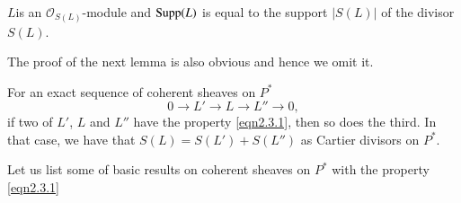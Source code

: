 \begin{lemma}\label{lemma2.7}
$L$\pageoriginale is an $\mathscr{O}_{S(L)}$-module and $\mathrm{Supp}(L)$ is
  equal to the  support $|S(L)|$ of the divisor $S(L)$.
\end{lemma}

The proof of the next lemma is also obvious and hence we omit it. 

\begin{lemma}\label{lemma2.8}
For an exact sequence of coherent sheaves on $P^{\ast}$ 
$$
0\to L'\to L \to L''\to 0,
$$
if two of $L'$, $L$ and $L''$ have the property \eqref{eqn2.3.1}, then
so does the third. In that case, we have that $S(L)=S(L')+S(L'')$ as
Cartier divisors on $P^{\ast}$.
\end{lemma}

Let us list some of basic results on coherent sheaves on $P^{\ast}$
with the property \eqref{eqn2.3.1}

